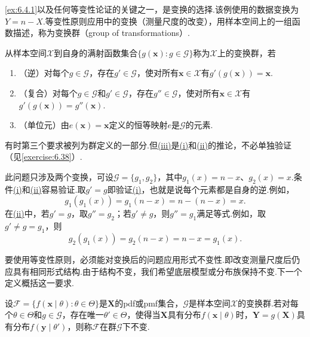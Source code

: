 \autoref{ex:6.4.1}以及任何等变性论证的关键之一，是变换的选择.该例使用的数据变换为$Y=n-X$.等变性原则应用中的变换（测量尺度的改变），用样本空间上的一组函数描述，称为变换群（group of transformations）.
\begin{definition}\label{def:6.4.2}
从样本空间$\mathcal X$到自身的满射函数集合$\{g(\boldsymbol x):g\in\mathcal G\}$称为$\mathcal X$上的变换群，若
\begin{enumerate}[label=(\roman*)]
\item\label{item:6.4.2i}（逆）对每个$g\in\mathcal G$，存在$g'\in\mathcal G$，使对所有$\boldsymbol x\in\mathcal X$有$g'(g(\boldsymbol x))=\boldsymbol x$.
\item\label{item:6.4.2ii}（复合）对每个$g\in\mathcal G$和$g'\in\mathcal G$，存在$g''\in\mathcal G$，使对所有$\boldsymbol x\in\mathcal X$有$g'(g(\boldsymbol x))=g''(\boldsymbol x)$.
\item\label{item:6.4.2iii}（单位元）由$e(\boldsymbol x)=\boldsymbol x$定义的恒等映射$e$是$\mathcal G$的元素.
\end{enumerate}
\end{definition}
有时第三个要求被列为群定义的一部分.但\hyperref[item:6.4.2iii]{(iii)}是\hyperref[item:6.4.2i]{(i)}和\hyperref[item:6.4.2ii]{(ii)}的推论，不必单独验证（见\autoref{exercise:6.38}）.
\begin{example}[续\autoref{ex:6.4.1}]\label{ex:6.4.3}
此问题只涉及两个变换，可设$\mathcal G=\{g_1,g_2\}$，其中$g_1(x)=n-x$、$g_2(x)=x$.条件\hyperref[item:6.4.2i]{(i)}和\hyperref[item:6.4.2ii]{(ii)}容易验证.取$g'=g$即验证\hyperref[item:6.4.2i]{(i)}，也就是说每个元素都是自身的逆.例如，
$$g_1(g_1(x))=g_1(n-x)=n-(n-x)=x.$$
在\hyperref[item:6.4.2ii]{(ii)}中，若$g'=g$，取$g''=g_2$；若$g'\ne g$，则$g''=g_1$满足等式.例如，取$g'\ne g=g_1$，则
$$g_2(g_1(x))=g_2(n-x)=n-x=g_1(x).$$
\end{example}
要使用等变性原则，必须能对变换后的问题应用形式不变性.即改变测量尺度后仍应具有相同形式结构.由于结构不变，我们希望底层模型或分布族保持不变.下一个定义概括这一要求.
\begin{definition}\label{def:6.4.4}
设$\mathcal F=\{f(\boldsymbol x\mid\theta):\theta\in\Theta\}$是$\boldsymbol X$的pdf或pmf集合，$\mathcal G$是样本空间$\mathcal X$的变换群.若对每个$\theta\in\Theta$和$g\in\mathcal G$，存在唯一$\theta'\in\Theta$，使得当$\boldsymbol X$具有分布$f(\boldsymbol x\mid\theta)$时，$\boldsymbol Y=g(\boldsymbol X)$具有分布$f(\boldsymbol y\mid\theta')$，则称$\mathcal F$在群$\mathcal G$下不变.
\end{definition}
